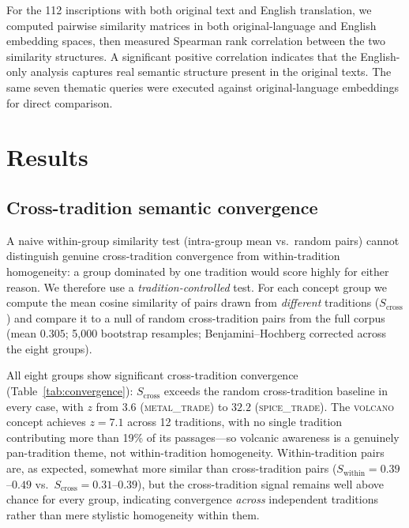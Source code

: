 \documentclass[12pt]{article}
\begin{document}
For the 112 inscriptions with both original text and English translation, we computed pairwise similarity matrices in both original-language and English embedding spaces, then measured Spearman rank correlation between the two similarity structures.
A significant positive correlation indicates that the English-only analysis captures real semantic structure present in the original texts.
The same seven thematic queries were executed against original-language embeddings for direct comparison.


\section{Results}

\subsection{Cross-tradition semantic convergence}

A naive within-group similarity test (intra-group mean vs.\ random pairs) cannot distinguish genuine cross-tradition convergence from within-tradition homogeneity: a group dominated by one tradition would score highly for either reason. We therefore use a \emph{tradition-controlled} test. For each concept group we compute the mean cosine similarity of pairs drawn from \emph{different} traditions ($S_\mathrm{cross}$) and compare it to a null of random cross-tradition pairs from the full corpus (mean $0.305$; 5{,}000 bootstrap resamples; Benjamini--Hochberg corrected across the eight groups).

All eight groups show significant cross-tradition convergence (Table~\ref{tab:convergence}): $S_\mathrm{cross}$ exceeds the random cross-tradition baseline in every case, with $z$ from $3.6$ (\textsc{metal\_trade}) to $32.2$ (\textsc{spice\_trade}). The \textsc{volcano} concept achieves $z = 7.1$ across 12 traditions, with no single tradition contributing more than 19\% of its passages---so volcanic awareness is a genuinely pan-tradition theme, not within-tradition homogeneity. Within-tradition pairs are, as expected, somewhat more similar than cross-tradition pairs ($S_\mathrm{within} = 0.39$--$0.49$ vs.\ $S_\mathrm{cross} = 0.31$--$0.39$), but the cross-tradition signal remains well above chance for every group, indicating convergence \emph{across} independent traditions rather than mere stylistic homogeneity within them.
\end{document}
